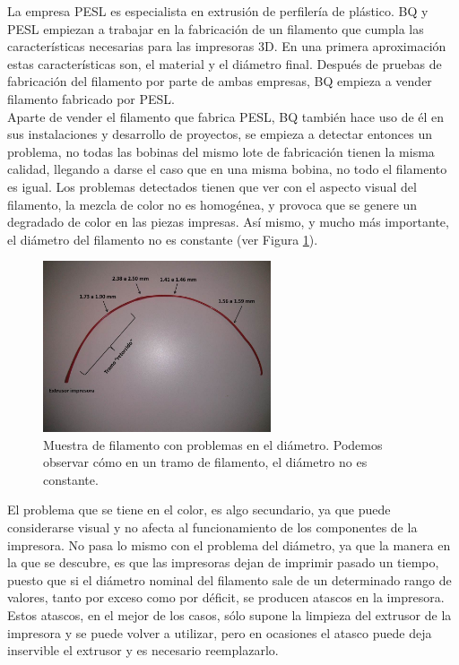 La empresa PESL es especialista en extrusión de perfilería de plástico. BQ y PESL empiezan a trabajar en la fabricación de un filamento que cumpla las características necesarias para las impresoras 3D. En una primera aproximación estas características son, el material y el diámetro final. Después de pruebas de fabricación del filamento por parte de ambas empresas, BQ empieza a vender filamento fabricado por PESL.\\

Aparte de vender el filamento que fabrica PESL, BQ también hace uso de él en sus instalaciones y desarrollo de proyectos, se empieza a detectar entonces un problema, no todas las bobinas del mismo lote de fabricación tienen la misma calidad, llegando a darse el caso que en una misma bobina, no todo el filamento es igual. Los problemas detectados tienen que ver con el aspecto visual del filamento, la mezcla de color no es homogénea, y provoca que se genere un degradado de color en las piezas impresas. Así mismo, y mucho más importante, el diámetro del filamento no es constante (ver Figura \ref{fig:muestra_filamento}).

\begin{figure}[!ht]
    \centering
    \includegraphics[width=0.6\textwidth]{images/atasco_rojo.jpg}
    \caption[Muestra de filamento con problemas en el diámetro]{Muestra de filamento con problemas en el diámetro. Podemos observar cómo en un tramo de filamento, el diámetro no es constante.}
    \label{fig:muestra_filamento}
\end{figure}

El problema que se tiene en el color, es algo secundario, ya que puede considerarse visual y no afecta al funcionamiento de los componentes de la impresora. No pasa lo mismo con el problema del diámetro, ya que la manera en la que se descubre, es que las impresoras dejan de imprimir pasado un tiempo, puesto que si el diámetro nominal del filamento sale de un determinado rango de valores, tanto por exceso como por déficit, se producen atascos en la impresora. Estos atascos, en el mejor de los casos, sólo supone la limpieza del extrusor de la impresora y se puede volver a utilizar, pero en ocasiones el atasco puede deja inservible el extrusor y es necesario reemplazarlo.\\

